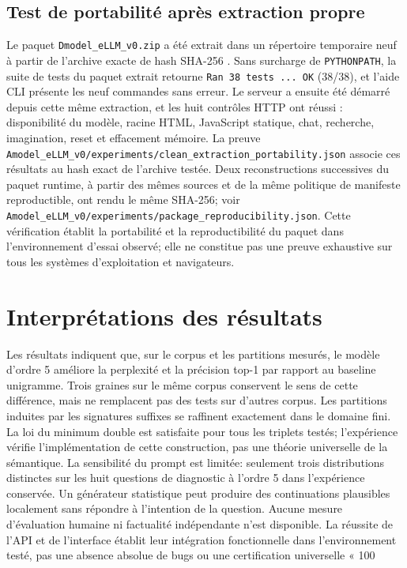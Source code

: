 \documentclass[11pt,a4paper]{article}
\begin{document}
\subsection{Test de portabilité après extraction propre}
Le paquet \texttt{Dmodel\_eLLM\_v0.zip} a été extrait dans un répertoire temporaire neuf à partir de l'archive exacte de hash SHA-256 \texttt{}. Sans surcharge de \texttt{PYTHONPATH}, la suite de tests du paquet extrait retourne \texttt{Ran 38 tests ... OK} (38/38), et l'aide CLI présente les neuf commandes sans erreur. Le serveur a ensuite été démarré depuis cette même extraction, et les huit contrôles HTTP ont réussi : disponibilité du modèle, racine HTML, JavaScript statique, chat, recherche, imagination, reset et effacement mémoire. La preuve \texttt{Amodel\_eLLM\_v0/experiments/clean\_extraction\_portability.json} associe ces résultats au hash exact de l'archive testée. Deux reconstructions successives du paquet runtime, à partir des mêmes sources et de la même politique de manifeste reproductible, ont rendu le même SHA-256; voir \texttt{Amodel\_eLLM\_v0/experiments/package\_reproducibility.json}. Cette vérification établit la portabilité et la reproductibilité du paquet dans l'environnement d'essai observé; elle ne constitue pas une preuve exhaustive sur tous les systèmes d'exploitation et navigateurs.

\section{Interprétations des résultats}
Les résultats indiquent que, sur le corpus et les partitions mesurés, le modèle d'ordre 5 améliore la perplexité et la précision top-1 par rapport au baseline unigramme. Trois graines sur le même corpus conservent le sens de cette différence, mais ne remplacent pas des tests sur d'autres corpus. Les partitions induites par les signatures suffixes se raffinent exactement dans le domaine fini. La loi du minimum double est satisfaite pour tous les triplets testés; l'expérience vérifie l'implémentation de cette construction, pas une théorie universelle de la sémantique.
La sensibilité du prompt est limitée: seulement trois distributions distinctes sur les huit questions de diagnostic à l'ordre 5 dans l'expérience conservée. Un générateur statistique peut produire des continuations plausibles localement sans répondre à l'intention de la question. Aucune mesure d'évaluation humaine ni factualité indépendante n'est disponible. La réussite de l'API et de l'interface établit leur intégration fonctionnelle dans l'environnement testé, pas une absence absolue de bugs ou une certification universelle « 100 %
\end{document}
